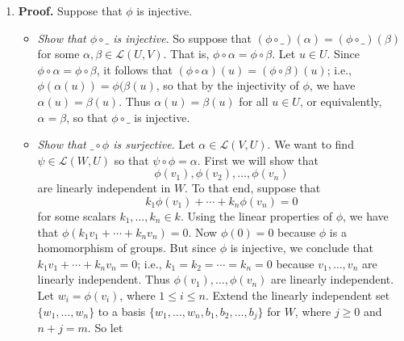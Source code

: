 \documentclass[9pt]{article}
\begin{document}
\begin{enumerate}
      \begin{enumerate}
         \item \textbf{Proof.} Suppose that $\phi$ is injective.
               \begin{itemize}
                  \item \textit{Show that $\phi\circ\_$ is injective}. So
                        suppose that
                        $(\phi\circ\_)(\alpha) = (\phi\circ\_)(\beta)$ for some
                        $\alpha, \beta \in \mathcal{L}(U, V)$. That is,
                        $\phi\circ\alpha = \phi\circ\beta$. Let $u \in U$. Since
                        $\phi\circ\alpha = \phi\circ\beta$, it follows that
                        $(\phi\circ\alpha)(u) = (\phi\circ\beta)(u)$; i.e.,
                        $\phi(\alpha(u)) = \phi(\beta(u)$, so that by the
                        injectivity of $\phi$, we have $\alpha(u) = \beta(u)$.
                        Thus $\alpha(u) = \beta(u)$ for all $u \in U$, or
                        equivalently, $\alpha = \beta$, so that $\phi\circ\_$ is
                        injective.
                  \item \textit{Show that $\_\circ\phi$ is surjective}. Let
                        $\alpha \in \mathcal{L}(V, U)$. We want to find
                        $\psi \in \mathcal{L}(W, U)$ so that
                        $\psi\circ\phi = \alpha$. First we will show that
                        $$\phi(v_1), \phi(v_2), \ldots, \phi(v_n)$$
                        are linearly independent in $W$. To that end, suppose
                        that
                        $$k_1\phi(v_1) + \cdots + k_n\phi(v_n) = 0$$
                        for some scalars $k_1, \ldots, k_n \in k$. Using the
                        linear properties of $\phi$, we have that
                        $\phi(k_1v_1 + \cdots + k_nv_n) = 0$. Now $\phi(0) = 0$
                        because $\phi$ is a homomorphism of groups. But since
                        $\phi$ is injective, we conclude that
                        $k_1v_1 + \cdots + k_nv_n = 0$; i.e.,
                        $k_1 = k_2 = \cdots = k_n = 0$ because
                        $v_1, \ldots, v_n$ are linearly independent. Thus
                        $\phi(v_1), \ldots, \phi(v_n)$ are linearly independent.
                        Let $w_i = \phi(v_i)$, where $1 \le i \le n$. Extend the
                        linearly independent set $\{w_1, \ldots, w_n\}$ to a 
                        basis $\{w_1, \ldots, w_n, b_1, b_2, \ldots, b_j\}$ for
                        $W$, where $j \ge 0$ and $n + j = m$. So let

\end{itemize}
\end{enumerate}
\end{enumerate}
\end{document}
